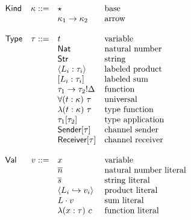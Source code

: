 \documentclass[12pt]{article}
\begin{document}
\[
\begin{array}{l r l l}
\textsf{Kind}   & \kappa ::= & \star                             & \text{base} \\
                &            & \kappa_1 \rightarrow \kappa_2     & \text{arrow} \\
\\
\textsf{Type}   &   \tau ::= & t                                 & \text{variable} \\
                &            & \textsf{Nat}                      & \text{natural number} \\
                &            & \textsf{Str}                      & \text{string} \\
                &            & \langle L_i : \tau_i \rangle      & \text{labeled product} \\
                &            & [ L_i : \tau_i ]                  & \text{labeled sum} \\
                &            & \tau_1 \rightarrow \tau_2!\Delta  & \text{function} \\
                &            & \forall (t : \kappa) \ \tau       & \text{universal} \\
                &            & \lambda (t : \kappa) \ \tau       & \text{type function} \\
                &            & \tau_1[\tau_2]                    & \text{type application} \\
                &            & \textsf{Sender}[\tau]             & \text{channel sender} \\
                &            & \textsf{Receiver}[\tau]           & \text{channel receiver} \\
\\
\textsf{Val}    &      v ::= & x                                 & \text{variable} \\
                &            & \overline{n}                      & \text{natural number literal} \\
                &            & \overline{s}                      & \text{string literal} \\
                &            & \langle
                               L_i \hookrightarrow v_i
                               \rangle                           & \text{product literal} \\
                &            & L \cdot v                         & \text{sum literal} \\
                &            & \lambda (x : \tau) \ c            & \text{function literal} \\

\end{array}\]
\end{document}
